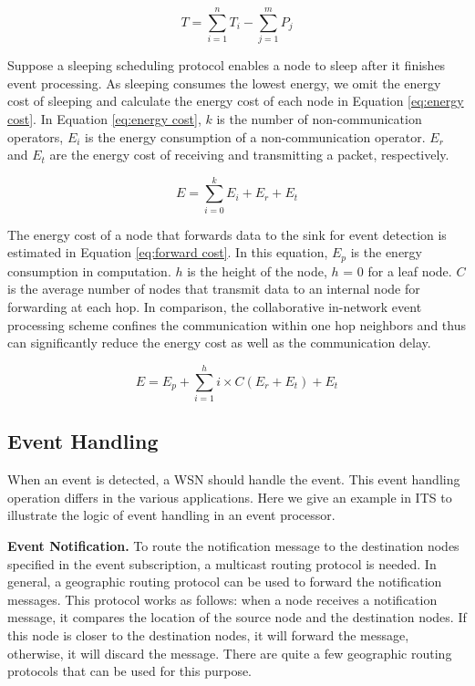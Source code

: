 \documentclass[12pt,journal,draftcls,letterpaper,onecolumn]{elsarticle}
\begin{document}
\begin{equation} \label{eq:time cost}
T = \sum^{n}_{i = 1} T_i - \sum^{m}_{j = 1} P_j
\end{equation}

Suppose a sleeping scheduling protocol enables a node to sleep after
it finishes event processing. As sleeping consumes the lowest
energy, we omit the energy cost of sleeping and calculate the energy
cost of each node in Equation \ref{eq:energy cost}. In Equation
\ref{eq:energy cost}, $k$ is the number of non-communication
operators, $E_i$ is the energy consumption of a non-communication
operator. $E_r$ and $E_t$ are the energy cost of receiving and
transmitting a packet, respectively.

\begin{equation} \label{eq:energy cost}
E = \sum^{k}_{i = 0} E_i + E_r + E_t
\end{equation}

The energy cost of a node that forwards data to the sink for event
detection is estimated in Equation \ref{eq:forward cost}. In this
equation, $E_p$ is the energy consumption in computation. $h$ is the
height of the node, $h$ = 0 for a leaf node. $C$ is the average
number of nodes that transmit data to an internal node for
forwarding at each hop. In comparison, the collaborative in-network
event processing scheme confines the communication within one hop
neighbors and thus can significantly reduce the energy cost as well
as the communication delay.

\begin{equation} \label{eq:forward cost}
E = E_p + \sum^{h}_{i = 1} i \times C(E_r + E_t) + E_t
\end{equation}


\subsection{Event Handling} \label{sec:Event Handling}

When an event is detected, a WSN should handle the event. This event
handling operation differs in the various applications. Here we give
an example in ITS to illustrate the logic of event handling in an
event processor.


\textbf{Event Notification.} To route the notification message to
the destination nodes specified in the event subscription, a
multicast routing protocol is needed. In general, a geographic
routing protocol can be used to forward the notification messages.
This protocol works as follows: when a node receives a notification
message, it compares the location of the source node and the
destination nodes. If this node is closer to the destination nodes,
it will forward the message, otherwise, it will discard the message.
There are quite a few geographic routing protocols that can be used
for this purpose.
\end{document}
